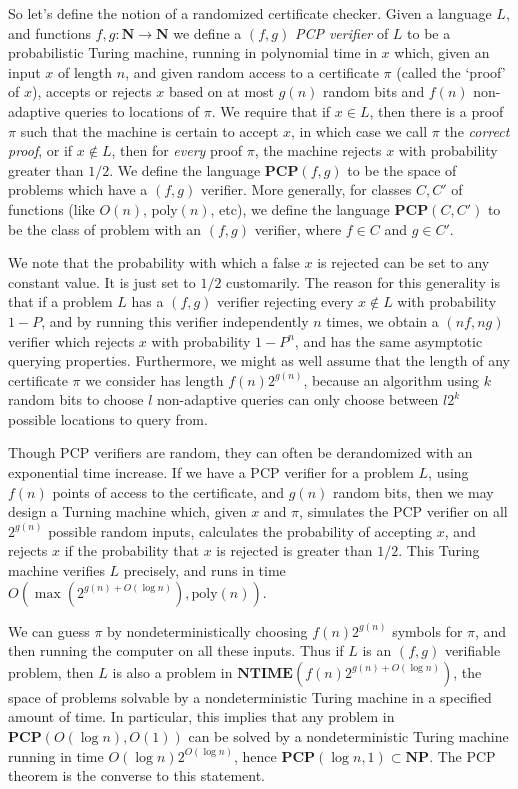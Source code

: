 So let's define the notion of a randomized certificate checker. Given a language $L$, and functions $f,g: \mathbf{N} \to \mathbf{N}$ we define a $(f,g)$ \emph{PCP verifier} of $L$ to be a probabilistic Turing machine, running in polynomial time in $x$ which, given an input $x$ of length $n$, and given random access to a certificate $\pi$ (called the `proof' of $x$), accepts or rejects $x$ based on at most $g(n)$ random bits and $f(n)$ non-adaptive queries to locations of $\pi$. We require that if $x \in L$, then there is a proof $\pi$ such that the machine is certain to accept $x$, in which case we call $\pi$ the \emph{correct proof}, or if $x \not \in L$, then for {\it every} proof $\pi$, the machine rejects $x$ with probability greater than $1/2$. We define the language $\mathbf{PCP}(f,g)$ to be the space of problems which have a $(f,g)$ verifier. More generally, for classes $C, C'$ of functions (like $O(n)$, $\text{poly}(n)$, etc), we define the language $\mathbf{PCP}(C,C')$ to be the class of problem with an $(f,g)$ verifier, where $f \in C$ and $g \in C'$.

We note that the probability with which a false $x$ is rejected can be set to any constant value. It is just set to $1/2$ customarily. The reason for this generality is that if a problem $L$ has a $(f,g)$ verifier rejecting every $x \not \in L$ with probability $1 - P$, and by running this verifier independently $n$ times, we obtain a $(nf,ng)$ verifier which rejects $x$ with probability $1 - P^n$, and has the same asymptotic querying properties. Furthermore, we might as well assume that the length of any certificate $\pi$ we consider has length $f(n)2^{g(n)}$, because an algorithm using $k$ random bits to choose $l$ non-adaptive queries can only choose between $l2^k$ possible locations to query from.

Though PCP verifiers are random, they can often be derandomized with an exponential time increase. If we have a PCP verifier for a problem $L$, using $f(n)$ points of access to the certificate, and $g(n)$ random bits, then we may design a Turning machine which, given $x$ and $\pi$, simulates the PCP verifier on all $2^{g(n)}$ possible random inputs, calculates the probability of accepting $x$, and rejects $x$ if the probability that $x$ is rejected is greater than $1/2$. This Turing machine verifies $L$ precisely, and runs in time $O(\max(2^{g(n) + O(\log n)}), \text{poly}(n))$.

We can guess $\pi$ by nondeterministically choosing $f(n)2^{g(n)}$ symbols for $\pi$, and then running the computer on all these inputs. Thus if $L$ is an $(f,g)$ verifiable problem, then $L$ is also a problem in $\mathbf{NTIME}(f(n)2^{g(n) + O(\log n)})$, the space of problems solvable by a nondeterministic Turing machine in a specified amount of time. In particular, this implies that any problem in $\mathbf{PCP}(O(\log n), O(1))$ can be solved by a nondeterministic Turing machine running in time $O(\log n) 2^{O(\log n)}$, hence $\mathbf{PCP}(\log n, 1) \subset \mathbf{NP}$. The PCP theorem is the converse to this statement.

